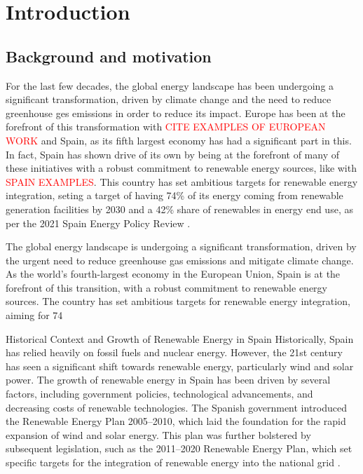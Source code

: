 \section{Introduction}
\subsection{Background and motivation}

For the last few decades, the global energy landscape has been undergoing a significant transformation, driven by climate change and the need to reduce greenhouse ges emissions in order to reduce its impact. Europe has been at the forefront of this transformation with \textcolor{red}{CITE EXAMPLES OF EUROPEAN WORK} and Spain, as its fifth largest economy has had a significant part in this. In fact, Spain has shown drive of its own by being at the forefront of many of these initiatives with a robust commitment to renewable energy sources, like with \textcolor{red}{SPAIN EXAMPLES}. This country has set ambitious targets for renewable energy integration, seting a target of having 74\% of its energy coming from renewable generation facilities by 2030 and a 42\% share of renewables in energy end use, as per the 2021 Spain Energy Policy Review \cite{energy_policy_review_spain_2021}. 


The global energy landscape is undergoing a significant transformation, driven by the urgent need to reduce greenhouse gas emissions and mitigate climate change. As the world's fourth-largest economy in the European Union, Spain is at the forefront of this transition, with a robust commitment to renewable energy sources. The country has set ambitious targets for renewable energy integration, aiming for 74%

Historical Context and Growth of Renewable Energy in Spain
Historically, Spain has relied heavily on fossil fuels and nuclear energy. However, the 21st century has seen a significant shift towards renewable energy, particularly wind and solar power. The growth of renewable energy in Spain has been driven by several factors, including government policies, technological advancements, and decreasing costs of renewable technologies. The Spanish government introduced the Renewable Energy Plan 2005–2010, which laid the foundation for the rapid expansion of wind and solar energy. This plan was further bolstered by subsequent legislation, such as the 2011–2020 Renewable Energy Plan, which set specific targets for the integration of renewable energy into the national grid .

